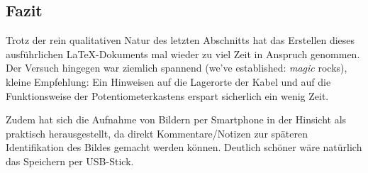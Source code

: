 \subsection{Fazit}
Trotz der rein qualitativen Natur des letzten Abschnitts hat das Erstellen dieses ausführlichen \LaTeX-Dokuments mal wieder zu viel Zeit in Anspruch genommen. Der Versuch hingegen war ziemlich spannend (we've established: \emph{magic} rocks), kleine Empfehlung: Ein Hinweisen auf die Lagerorte der Kabel und auf die Funktionsweise der Potentiometerkastens erspart sicherlich ein wenig Zeit.

Zudem hat sich die Aufnahme von Bildern per Smartphone in der Hinsicht als praktisch herausgestellt, da direkt Kommentare/Notizen zur späteren Identifikation des Bildes gemacht werden können. Deutlich schöner wäre natürlich das Speichern per USB-Stick.
